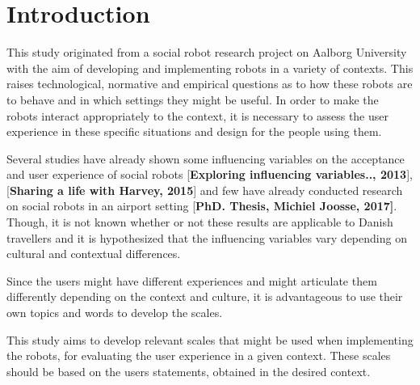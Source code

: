 \section{Introduction}
\label{Introduction}

This study originated from a social robot research project on Aalborg University with the aim of developing and implementing robots in a variety of contexts. This raises technological, normative and empirical questions as to how these robots are to behave and in which settings they might be useful. 
In order to make the robots interact appropriately to the context, it is necessary to assess the user experience in these specific situations and design for the people using them.

Several studies have already shown some influencing variables on the acceptance and user experience of social robots [\textbf{Exploring influencing variables.., 2013}], [\textbf{Sharing a life with Harvey, 2015}] and few have already conducted research on social robots in an airport setting [\textbf{PhD. Thesis, Michiel Joosse, 2017]}. Though, it is not known whether or not these results are applicable to Danish travellers and it is hypothesized that the influencing variables vary depending on cultural and contextual differences.

Since the users might have different experiences and might articulate them differently depending on the context and culture, it is advantageous to use their own topics and words to develop the scales.

This study aims to develop relevant scales that might be used when implementing the robots, for evaluating the user experience in a given context. These scales should be based on the users statements, obtained in the desired context.








